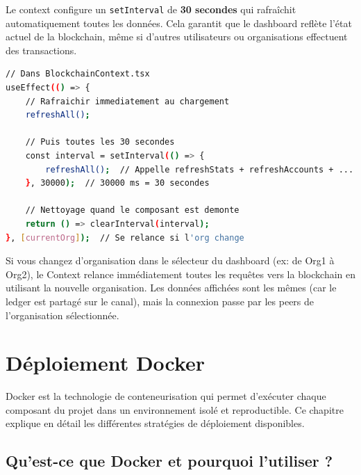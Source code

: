 \documentclass[12pt,a4paper,twoside]{report}
\begin{document}
Le context configure un \texttt{setInterval} de \textbf{30 secondes} qui rafraîchit automatiquement toutes les données. Cela garantit que le dashboard reflète l'état actuel de la blockchain, même si d'autres utilisateurs ou organisations effectuent des transactions.

\begin{lstlisting}[language=bash, caption=Principe de l'auto-rafraîchissement]
// Dans BlockchainContext.tsx
useEffect(() => {
    // Rafraichir immediatement au chargement
    refreshAll();
    
    // Puis toutes les 30 secondes
    const interval = setInterval(() => {
        refreshAll();  // Appelle refreshStats + refreshAccounts + ...
    }, 30000);  // 30000 ms = 30 secondes
    
    // Nettoyage quand le composant est demonte
    return () => clearInterval(interval);
}, [currentOrg]);  // Se relance si l'org change
\end{lstlisting}

\begin{tipbox}
Si vous changez d'organisation dans le sélecteur du dashboard (ex: de Org1 à Org2), le Context relance immédiatement toutes les requêtes vers la blockchain en utilisant la nouvelle organisation. Les données affichées sont les mêmes (car le ledger est partagé sur le canal), mais la connexion passe par les peers de l'organisation sélectionnée.
\end{tipbox}


\chapter{Déploiement Docker}

Docker est la technologie de conteneurisation qui permet d'exécuter chaque composant du projet dans un environnement isolé et reproductible. Ce chapitre explique en détail les différentes stratégies de déploiement disponibles.

\section{Qu'est-ce que Docker et pourquoi l'utiliser ?}
\end{document}
